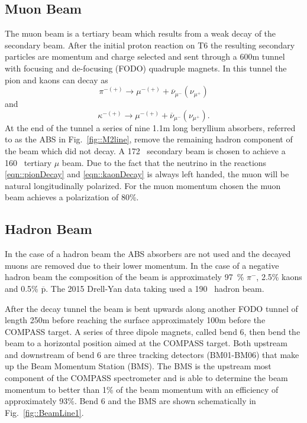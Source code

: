 \subsection{Muon Beam}
The muon beam is a tertiary beam which results from a weak decay of the
secondary beam.  After the initial proton reaction on T6 the resulting secondary
particles are momentum and charge selected and sent through a 600m tunnel with
focusing and de-focusing (FODO) quadruple magnets.  In this tunnel the pion and
kaons can decay as
\begin{equation}
  \pi^{-(+)} \rightarrow \mu^{-(+)} + \overline{\nu}_{\mu^-}(\nu_{\mu^+})
  \label{eqn::pionDecay}
\end{equation}
\noindent
and
\begin{equation}
  \kappa^{-(+)} \rightarrow \mu^{-(+)} + \overline{\nu}_{\mu^-}(\nu_{\mu^+}).
  \label{eqn::kaonDecay}
\end{equation}
\noindent
At the end of the tunnel a series of nine 1.1m long beryllium absorbers,
referred to as the ABS in Fig.~\ref{fig::M2line}, remove the remaining hadron
component of the beam which did not decay.  A 172~{\gvc} secondary beam is
chosen to achieve a 160~{\gvc} tertiary $\mu$ beam.  Due to the fact that the
neutrino in the reactions \ref{eqn::pionDecay} and \ref{eqn::kaonDecay} is
always left handed, the muon will be natural longitudinally polarized.  For the
muon momentum chosen the muon beam achieves a polarization of 80\%.

\subsection{Hadron Beam}
In the case of a hadron beam the ABS absorbers are not used and the decayed
muons are removed due to their lower momentum.  In the case of a negative hadron
beam the composition of the beam is approximately 97~\% $\pi^-$, 2.5\% kaons and
0.5\% $\overline{\mathrm{p}}$. The 2015 Drell-Yan data taking used a 190~{\gvc}
hadron beam. \par

After the decay tunnel the beam is bent upwards along another FODO tunnel of
length 250m before reaching the surface approximately 100m before the COMPASS
target.  A series of three dipole magnets, called bend 6, then bend the beam to
a horizontal position aimed at the COMPASS target.  Both upstream and downstream
of bend 6 are three tracking detectors (BM01-BM06) that make up the Beam
Momentum Station (BMS).  The BMS is the upstream most component of the COMPASS
spectrometer and is able to determine the beam momentum to better than 1\% of
the beam momentum with an efficiency of approximately 93\%.  Bend 6 and the BMS
are shown schematically in Fig.~\ref{fig::BeamLine1}. \par

